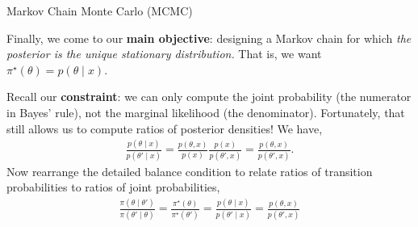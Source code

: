 \documentclass[aspectratio=169]{beamer}
\begin{document}
\begin{frame}[t,allowframebreaks]{Markov Chain Monte Carlo
(MCMC)}\label{markov-chain-monte-carlo-mcmc}

Finally, we come to our \textbf{main objective}: designing a Markov
chain for which \emph{the posterior is the unique stationary
distribution.} That is, we want
\(\pi^\star(\theta) = p(\theta \mid x)\).

Recall our \textbf{constraint}: we can only compute the joint
probability (the numerator in Bayes' rule), not the marginal likelihood
(the denominator). Fortunately, that still allows us to compute ratios
of posterior densities! We have, \begin{align*}
\frac{p(\theta \mid x)}{p(\theta' \mid x)} = \frac{p(\theta, x)}{p(x)} \frac{p(x)}{p(\theta', x)} = \frac{p(\theta, x)}{p(\theta', x)}.
\end{align*} Now rearrange the detailed balance condition to relate
ratios of transition probabilities to ratios of joint probabilities,
\begin{align*}
\frac{\pi(\theta \mid \theta')}{\pi(\theta' \mid \theta)} = \frac{\pi^\star(\theta)}{\pi^\star(\theta')} 
= \frac{p(\theta \mid x)}{p(\theta' \mid x)} = \frac{p(\theta, x)}{p(\theta', x)}
\end{align*}
\end{frame}
\end{document}
